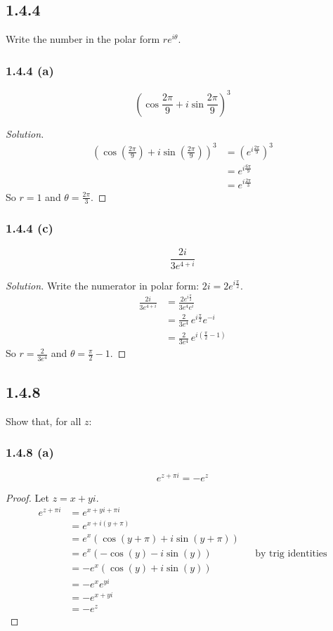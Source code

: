 \documentclass{article}
\newenvironment{solution}{
\begin{proof}[Solution]}{
\end{proof}}
\begin{document}
\subsection*{1.4.4}
Write the number in the polar form $re^{i\theta}$.

\subsubsection*{1.4.4 (a)}
\[
  \left(\cos\frac{2\pi}{9} + i\sin\frac{2\pi}{9}\right)^3
\]
\begin{solution}
  \begin{align*}
    \left(\cos\left(\tfrac{2\pi}{9}\right) + i\sin\left(\tfrac{2\pi}{9}\right)\right)^3
    &= \left(e^{i\frac{2\pi}{9}}\right)^3
    \\ &= e^{i\frac{6\pi}{9}}
    \\ &= e^{i\frac{2\pi}{3}}
  \end{align*}
  So $r = 1$ and $\theta = \frac{2\pi}{3}$.
\end{solution}

\subsubsection*{1.4.4 (c)}
\[
  \frac{2i}{3e^{4+i}}
\]
\begin{solution}
  Write the numerator in polar form: $2i = 2e^{i\frac{\pi}{2}}$.
  \begin{align*}
    \frac{2i}{3e^{4 + i}}
    &= \frac{2e^{i\frac{\pi}{2}}}{3e^4 e^{i}}
    \\ &= \frac{2}{3e^4}\, e^{i\frac{\pi}{2}} e^{-i}
    \\ &= \frac{2}{3e^4}\, e^{i\left(\frac{\pi}{2} - 1\right)}
  \end{align*}
  So $r = \frac{2}{3e^4}$ and $\theta = \frac{\pi}{2} - 1$.
\end{solution}

\subsection*{1.4.8}
Show that, for all $z$:

\subsubsection*{1.4.8 (a)}
\[
  e^{z+\pi i} = -e^z
\]
\begin{proof}
  Let $z = x + yi$.
  \begin{align*}
    e^{z + \pi i} &= e^{x + yi + \pi i}
    \\ &= e^{x + i(y + \pi)}
    \\ &= e^x(\cos(y + \pi) + i\sin(y + \pi))
    \\ &= e^x(-\cos(y) - i\sin(y))
    && \text{by trig identities}
    \\ &= -e^x(\cos(y) + i\sin(y))
    \\ &= -e^x e^{yi}
    \\ &= -e^{x + yi}
    \\ &= -e^z
  \end{align*}
\end{proof}
\end{document}
